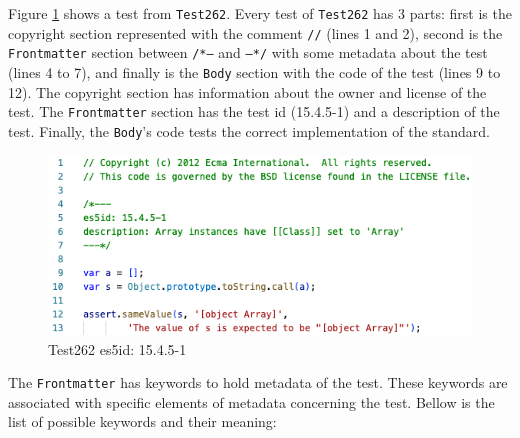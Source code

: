 \documentclass[runningheads]{llncs}
\begin{document}
Figure \ref{fig:Test262_example} shows a test from \texttt{Test262}. Every test of \texttt{Test262} has 3 parts: first is the copyright section represented with the comment \texttt{//} (lines 1 and 2), second is the \texttt{Frontmatter} section between \texttt{/*---} and \texttt{---*/} with some metadata about the test (lines 4 to 7), and finally is the \texttt{Body} section with the code of the test (lines 9 to 12). The copyright section has information about the owner and license of the test. The \texttt{Frontmatter} section has the test id (15.4.5-1) and a description of the test. Finally, the \texttt{Body}'s code tests the correct implementation of the standard.

\begin{figure}[ht]
    \centering
    \includegraphics[width=1.0\textwidth]{images/test262_array_test.png}
    \caption{Test262 es5id: 15.4.5-1}
    \label{fig:Test262_example}
\end{figure}



The \texttt{Frontmatter} has keywords to hold metadata of the test. These keywords are associated with specific elements of metadata concerning the test. Bellow is the list of possible keywords and their meaning:
\end{document}
